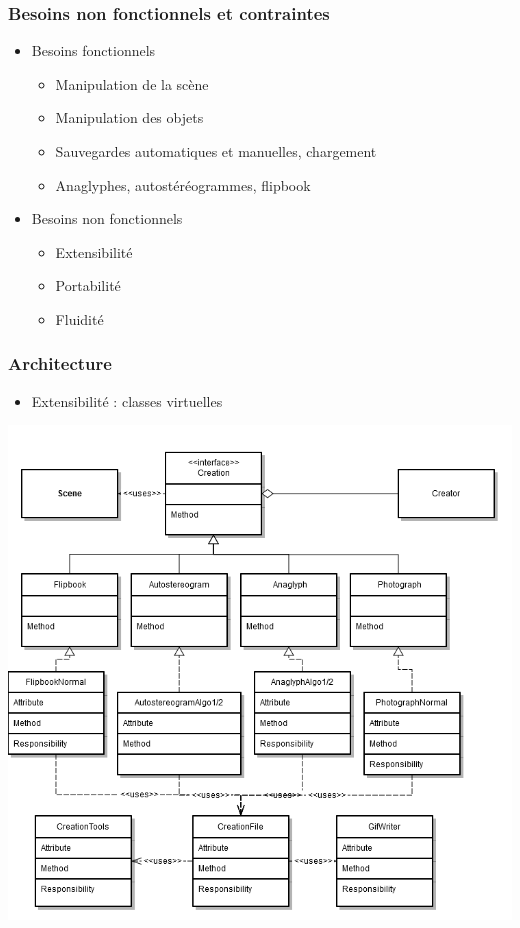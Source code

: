 \documentclass{beamer}
\begin{document}
\begin{frame}
\frametitle{Besoins non fonctionnels et contraintes}
\begin{itemize}[label=$\bullet$]
\item Besoins fonctionnels
	\begin{itemize}[label=$\circ$]
	\item Manipulation de la scène
	\item Manipulation des objets
	\item Sauvegardes automatiques et manuelles, chargement
	\item Anaglyphes, autostéréogrammes, flipbook
	\end{itemize}
\item Besoins non fonctionnels
	\begin{itemize}[label=$\circ$]
	\item Extensibilité
	\item Portabilité
	\item Fluidité
	\end{itemize}
\end{itemize}
\end{frame}


\begin{frame}
\frametitle{Architecture}
\begin{itemize}[label=$\bullet$]
\item Extensibilité : classes virtuelles  
\end{itemize}
\centering
\includegraphics[scale=0.25]{extensibilite.png}
\end{frame}
\end{document}
